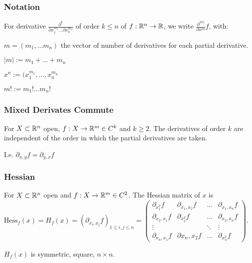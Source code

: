 \subsubsection{Notation}
For derivative $\frac{\partial^{k}}{\partial x_1^{m_1} \dots \partial x_n^{m_n}}$ of order $k \le n$ of $f: \mathbb{R}^n \to \mathbb{R}$, we write $\frac{\partial^{|m|}}{\partial x^{m}} f$, with:
\begin{inparaitem}
    \item $m = (m_1, \dots m_n)$ the vector of number of derivatives for each partial derivative.
    \item $|m| := m_1 + \dots + m_n$
    \item $x^n := (x_1^{m_1}, \dots , x_n^{m_n}$
    \item $m! := m_1! \dots m_n!$
\end{inparaitem}

\subsubsection{Mixed Derivates Commute}
For $X \subset \mathbb{R}^n$ open, $f: X \to \mathbb{R}^m \in C^k$ and $k \ge 2$. The derivatives of order $k$ are independent of the order in which the partial derivatives are taken.

\begin{compactitem}
    \item I.e. $\partial_{x, y} f = \partial_{y, x} f$
\end{compactitem}

\subsubsection{Hessian}
For $X \subset \mathbb{R}^n$ open and $f: X \to \mathbb{R}^m \in C^2$. The Hessian matrix of $x$ is $\text{Hess}_f(x) = H_f(x) = (\partial_{x_i, x_j}f)_{1 \le i, j \le n} =
\begin{pmatrix}
    \partial_{x_1^2} f & \partial_{x_1, x_2} f & \dots & \partial_{x_1, x_n} f\\
    \partial_{x_2, x_1} f & \partial_{x_2^2} f & \dots & \partial_{x_2, x_n} f\\
    \vdots & & \ddots & \vdots\\
    \partial_{x_n, x_1} f & \partial{x_n, x_2} f & \dots & \partial_{x_n^2} f
\end{pmatrix}$.

\begin{compactitem}
    \item $H_f(x)$ is symmetric, square, $n \times n$.
\end{compactitem}

